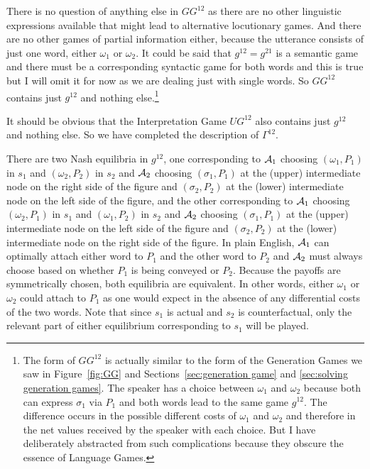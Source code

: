 There is no question of anything else in $GG^{12}$ as there are no other linguistic expressions available that might lead to alternative locutionary games. And there are no other games of partial information either, because the utterance consists of just one word, either $\omega_1$ or $\omega_2$. It could be said that $g^{12} = g^{21}$ is a semantic game and there must be a corresponding syntactic game for both words and this is true but I will omit it for now as we are dealing just with single words. So $GG^{12}$ contains just $g^{12}$ and nothing else.\footnote{The form of $GG^{12}$ is actually similar to the form of the Generation Games we saw in Figure~\ref{fig:GG} and Sections~\ref{sec:generation game} and \ref{sec:solving generation games}. The speaker has a choice between $\omega_1$ and $\omega_2$ because both can express $\sigma_1$ via $P_1$ and both words lead to the same game $g^{12}$. The difference occurs in the possible different costs of $\omega_1$ and $\omega_2$ and therefore in the net values received by the speaker with each choice. But I have deliberately abstracted from such complications because they obscure the essence of Language Games.}

It should be obvious that the Interpretation Game $UG^{12}$ also contains just $g^{12}$ and nothing else. So we have completed the description of $\Gamma^{12}$.

There are two Nash equilibria in $g^{12}$, one corresponding to ${\cal A}_1$ choosing $(\omega_1,\allowbreak P_1)$ in $s_1$ and $(\omega_2,P_2)$ in $s_2$ and ${\cal A}_2$ choosing $(\sigma_1,P_1)$ at the (upper) intermediate node on the right side of the figure and $(\sigma_2,P_2)$ at the (lower) intermediate node on the left side of the figure, and the other corresponding to ${\cal A}_1$ choosing $(\omega_2,P_1)$ in $s_1$ and $(\omega_1,P_2)$ in $s_2$ and ${\cal A}_2$ choosing $(\sigma_1,P_1)$ at the (upper) intermediate node on the left side of the figure and $(\sigma_2,P_2)$ at the (lower) intermediate node on the right side of the figure. In plain English, ${\cal A}_1$ can optimally attach either word to $P_1$ and the other word to $P_2$ and ${\cal A}_2$ must always choose based on whether $P_1$ 
is being conveyed or $P_2$. Because the payoffs are symmetrically chosen, both equilibria are equivalent. In other words, either $\omega_1$ or $\omega_2$ could attach to $P_1$ as one would expect in the absence of any differential costs of the two words. Note that since $s_1$ is actual and $s_2$ is counterfactual, only the relevant part of either equilibrium corresponding to $s_1$ will be played.

